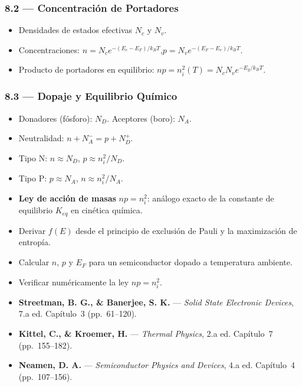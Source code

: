 \documentclass[11pt, letterpaper]{article}
\begin{document}
\subsubsection{8.2 --- Concentraci\'on de Portadores}
\begin{itemize}
  \item Densidades de estados efectivas $N_c$ y $N_v$.
  \item Concentraciones: $n=N_c e^{-(E_c-E_F)/k_BT}$,\quad $p=N_v e^{-(E_F-E_v)/k_BT}$.
  \item Producto de portadores en equilibrio: $np=n_i^2(T)=N_cN_v e^{-E_g/k_BT}$.
\end{itemize}

\subsubsection{8.3 --- Dopaje y Equilibrio Qu\'imico}
\begin{itemize}
  \item Donadores (f\'osforo): $N_D$. Aceptores (boro): $N_A$.
  \item Neutralidad: $n+N_A^-=p+N_D^+$.
  \item Tipo N: $n\approx N_D$,\; $p\approx n_i^2/N_D$.
  \item Tipo P: $p\approx N_A$,\; $n\approx n_i^2/N_A$.
  \item \textbf{Ley de acci\'on de masas} $np=n_i^2$: an\'alogo exacto de la constante de equilibrio $K_{eq}$ en cin\'etica qu\'imica.
\end{itemize}

\begin{objetivos}
\begin{itemize}
  \item Derivar $f(E)$ desde el principio de exclusi\'on de Pauli y la maximizaci\'on de entrop\'ia.
  \item Calcular $n$, $p$ y $E_F$ para un semiconductor dopado a temperatura ambiente.
  \item Verificar num\'ericamente la ley $np=n_i^2$.
\end{itemize}
\end{objetivos}

\begin{lecturas}
\begin{itemize}
  \item[$(\star)$] \textbf{Streetman, B. G., \& Banerjee, S. K.} --- \emph{Solid State Electronic Devices}, 7.a ed. Cap\'itulo~3 (pp.\ 61--120).
  \item[$(\star)$] \textbf{Kittel, C., \& Kroemer, H.} --- \emph{Thermal Physics}, 2.a ed. Cap\'itulo~7 (pp.\ 155--182).
  \item \textbf{Neamen, D. A.} --- \emph{Semiconductor Physics and Devices}, 4.a ed. Cap\'itulo~4 (pp.\ 107--156).
\end{itemize}
\end{lecturas}
\end{document}
